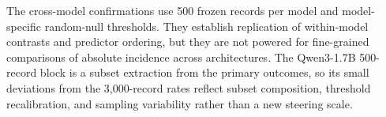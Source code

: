 The cross-model confirmations use 500 frozen records per model and
model-specific random-null thresholds. They establish replication of
within-model contrasts and predictor ordering, but they are not powered for
fine-grained comparisons of absolute incidence across architectures. The
Qwen3-1.7B 500-record block is a subset extraction from the primary outcomes,
so its small deviations from the 3,000-record rates reflect subset composition,
threshold recalibration, and sampling variability rather than a new steering
scale.

